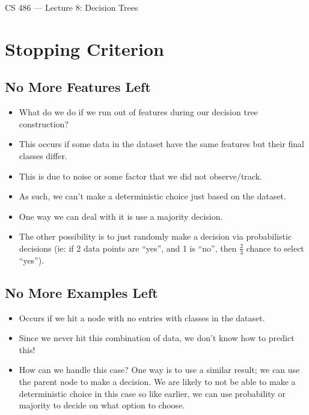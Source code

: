 \documentclass{article}
\author{Clement Tsang}
\begin{document}
\begin{center}
    \Large{CS 486 --- Lecture 8: Decision Trees}
\end{center}

\section{Stopping Criterion}
\subsection{No More Features Left}
\begin{itemize}
    \item What do we do if we run out of features during our decision tree construction?
    \item This occurs if some data in the dataset have the same features but their final classes differ.
    \item This is due to noise or some factor that we did not observe/track.
    \item As such, we can't make a deterministic choice just based on the dataset.
    \item One way we can deal with it is use a majority decision.
    \item The other possibility is to just randomly make a decision via probabilistic decisions (ie: if 2 data points are ``yes'', and 1 is ``no'', then $\frac{2}{3}$ chance to select ``yes'').
\end{itemize}

\subsection{No More Examples Left}
\begin{itemize}
    \item Occurs if we hit a node with no entries with classes in the dataset.
    \item Since we never hit this combination of data, we don't know how to predict this!
    \item How can we handle this case?  One way is to use a similar result; we can use the parent node to make a decision.  We are likely to not be able to make a deterministic choice in this case so like earlier, we can use probability or majority to decide on what option to choose.
\end{itemize}
\end{document}
